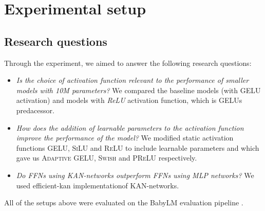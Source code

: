
\section{Experimental setup} %
\label{sec:experimental_setup}

\subsection{Research questions}
Through the experiment, we aimed to answer the following research questions:
\begin{itemize}
    \item \textit{Is the choice of activation function relevant to the performance of smaller models with 10M parameters?}  We compared the baseline models (with \textsc{GELU} activation) and models with \textit{ReLU} activation function, which is \textsc{GELU}s predacessor.
    \item \textit{How does the addition of learnable parameters to the activation function improve the performance of the model?} We modified static activation functions \textsc{GELU}, \textsc{SiLU} and \textsc{ReLU} to include learnable parameters and which gave us \textsc{Adaptive GELU}, \textsc{Swish} and \textsc{PReLU} respectively.
    \item \textit{Do FFNs using KAN-networks outperform FFNs using MLP networks?} We used efficient-kan implementation\footnotemark[3] of KAN-networks.
\end{itemize}
All of the setups above were evaluated on the BabyLM evaluation pipeline \cite{Warstadt2023}.


